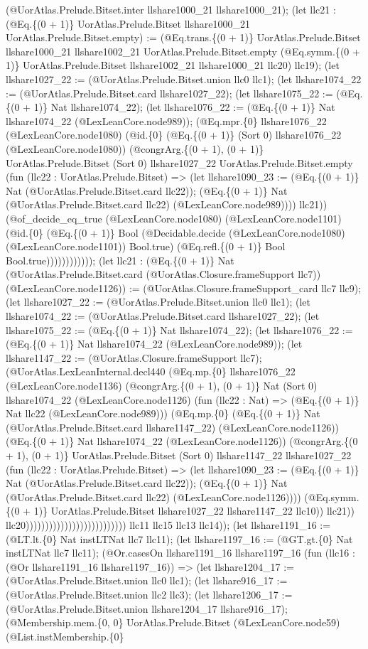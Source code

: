 \documentclass[11pt]{article}
\begin{document}
(@UorAtlas.Prelude.Bitset.inter llshare1000\_21 llshare1000\_21); (let llc21 : (@Eq.\{(0 + 1)\} UorAtlas.Prelude.Bitset llshare1000\_21 UorAtlas.Prelude.Bitset.empty) := (@Eq.trans.\{(0 + 1)\} UorAtlas.Prelude.Bitset llshare1000\_21 llshare1002\_21 UorAtlas.Prelude.Bitset.empty (@Eq.symm.\{(0 + 1)\} UorAtlas.Prelude.Bitset llshare1002\_21 llshare1000\_21 llc20) llc19); (let llshare1027\_22 := (@UorAtlas.Prelude.Bitset.union llc0 llc1); (let llshare1074\_22 := (@UorAtlas.Prelude.Bitset.card llshare1027\_22); (let llshare1075\_22 := (@Eq.\{(0 + 1)\} Nat llshare1074\_22); (let llshare1076\_22 := (@Eq.\{(0 + 1)\} Nat llshare1074\_22 (@LexLeanCore.node989)); (@Eq.mpr.\{0\} llshare1076\_22 (@LexLeanCore.node1080) (@id.\{0\} (@Eq.\{(0 + 1)\} (Sort 0) llshare1076\_22 (@LexLeanCore.node1080)) (@congrArg.\{(0 + 1), (0 + 1)\} UorAtlas.Prelude.Bitset (Sort 0) llshare1027\_22 UorAtlas.Prelude.Bitset.empty (fun (llc22 : UorAtlas.Prelude.Bitset) => (let llshare1090\_23 := (@Eq.\{(0 + 1)\} Nat (@UorAtlas.Prelude.Bitset.card llc22)); (@Eq.\{(0 + 1)\} Nat (@UorAtlas.Prelude.Bitset.card llc22) (@LexLeanCore.node989)))) llc21)) (@of\_decide\_eq\_true (@LexLeanCore.node1080) (@LexLeanCore.node1101) (@id.\{0\} (@Eq.\{(0 + 1)\} Bool (@Decidable.decide (@LexLeanCore.node1080) (@LexLeanCore.node1101)) Bool.true) (@Eq.refl.\{(0 + 1)\} Bool Bool.true)))))))))))); (let llc21 : (@Eq.\{(0 + 1)\} Nat (@UorAtlas.Prelude.Bitset.card (@UorAtlas.Closure.frameSupport llc7)) (@LexLeanCore.node1126)) := (@UorAtlas.Closure.frameSupport\_card llc7 llc9); (let llshare1027\_22 := (@UorAtlas.Prelude.Bitset.union llc0 llc1); (let llshare1074\_22 := (@UorAtlas.Prelude.Bitset.card llshare1027\_22); (let llshare1075\_22 := (@Eq.\{(0 + 1)\} Nat llshare1074\_22); (let llshare1076\_22 := (@Eq.\{(0 + 1)\} Nat llshare1074\_22 (@LexLeanCore.node989)); (let llshare1147\_22 := (@UorAtlas.Closure.frameSupport llc7); (@UorAtlas.LexLeanInternal.decl440 (@Eq.mp.\{0\} llshare1076\_22 (@LexLeanCore.node1136) (@congrArg.\{(0 + 1), (0 + 1)\} Nat (Sort 0) llshare1074\_22 (@LexLeanCore.node1126) (fun (llc22 : Nat) => (@Eq.\{(0 + 1)\} Nat llc22 (@LexLeanCore.node989))) (@Eq.mp.\{0\} (@Eq.\{(0 + 1)\} Nat (@UorAtlas.Prelude.Bitset.card llshare1147\_22) (@LexLeanCore.node1126)) (@Eq.\{(0 + 1)\} Nat llshare1074\_22 (@LexLeanCore.node1126)) (@congrArg.\{(0 + 1), (0 + 1)\} UorAtlas.Prelude.Bitset (Sort 0) llshare1147\_22 llshare1027\_22 (fun (llc22 : UorAtlas.Prelude.Bitset) => (let llshare1090\_23 := (@Eq.\{(0 + 1)\} Nat (@UorAtlas.Prelude.Bitset.card llc22)); (@Eq.\{(0 + 1)\} Nat (@UorAtlas.Prelude.Bitset.card llc22) (@LexLeanCore.node1126)))) (@Eq.symm.\{(0 + 1)\} UorAtlas.Prelude.Bitset llshare1027\_22 llshare1147\_22 llc10)) llc21)) llc20)))))))))))))))))))))))))) llc11 llc15 llc13 llc14)); (let llshare1191\_16 := (@LT.lt.\{0\} Nat instLTNat llc7 llc11); (let llshare1197\_16 := (@GT.gt.\{0\} Nat instLTNat llc7 llc11); (@Or.casesOn llshare1191\_16 llshare1197\_16 (fun (llc16 : (@Or llshare1191\_16 llshare1197\_16)) => (let llshare1204\_17 := (@UorAtlas.Prelude.Bitset.union llc0 llc1); (let llshare916\_17 := (@UorAtlas.Prelude.Bitset.union llc2 llc3); (let llshare1206\_17 := (@UorAtlas.Prelude.Bitset.union llshare1204\_17 llshare916\_17); (@Membership.mem.\{0, 0\} UorAtlas.Prelude.Bitset (@LexLeanCore.node59) (@List.instMembership.\{0\} 
\end{document}
